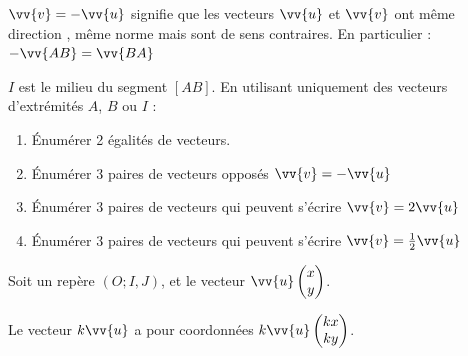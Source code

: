 \documentclass[main.tex]{subfiles}
\begin{document}
\begin{definition}  $\vv{v}=-\vv{u}$ signifie que les vecteurs $\vv{u}$ et $\vv{v}$  ont  même direction ,  même norme mais sont de sens contraires. 
En particulier : 	$-\vv{AB}=\vv{BA}$
\end{definition} 
\begin{example} $I$ est le milieu du segment $[AB]$. En utilisant uniquement des vecteurs d'extrémités  $A$, $B$ ou $I$ :
\begin{enumerate}[label=\alph*), leftmargin=*]
\item Énumérer 2 égalités de vecteurs.
\vfill
\item Énumérer 3 paires de vecteurs opposés $\vv{v}=-\vv{u}$
\vfill
\item Énumérer 3 paires de vecteurs qui peuvent s'écrire $\vv{v}=2\vv{u}$
\vfill
\item Énumérer 3 paires de vecteurs qui peuvent s'écrire $\vv{v}=\frac{1}{2}\vv{u}$
\vfill
\end{enumerate}
\end{example}
\vfill 
\begin{tBox} Soit un repère $(O;I,J)$, et le vecteur $\vv{u}\begin{pmatrix}
x\\y
\end{pmatrix}$.

\noindent	Le vecteur $k\vv{u}$ a pour coordonnées $k\vv{u}\begin{pmatrix}
kx\\ky
\end{pmatrix}$. 
%
\end{tBox}   
%	 
\end{document}
